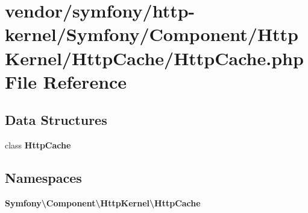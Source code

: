 \section{vendor/symfony/http-\/kernel/\+Symfony/\+Component/\+Http\+Kernel/\+Http\+Cache/\+Http\+Cache.php File Reference}
\label{_http_cache_8php}
\subsection*{Data Structures}
\begin{DoxyCompactItemize}
\item 
class {\bf Http\+Cache}
\end{DoxyCompactItemize}
\subsection*{Namespaces}
\begin{DoxyCompactItemize}
\item 
 {\bf Symfony\textbackslash{}\+Component\textbackslash{}\+Http\+Kernel\textbackslash{}\+Http\+Cache}
\end{DoxyCompactItemize}
